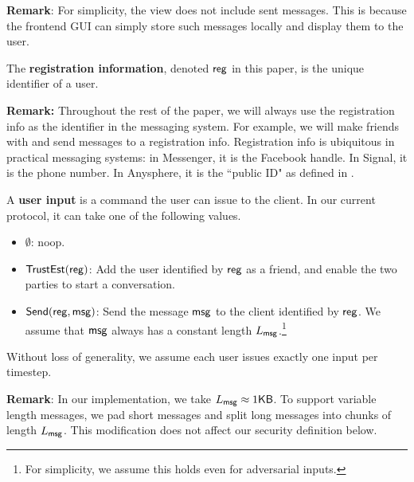 \textbf{Remark}: For simplicity, the view does not include sent messages. This is because the frontend GUI can simply store such messages locally and display them to the user.
\begin{definition}
\label{defn:messaging-registration-info}
The \textbf{registration information}, denoted $\mathsf{reg}$ in this paper, is the unique identifier of a user.
\end{definition}
\textbf{Remark: }Throughout the rest of the paper, we will always use the registration info as the identifier in the messaging system. For example, we will make friends with and send messages to a registration info. Registration info is ubiquitous in practical messaging systems: in Messenger, it is the Facebook handle. In Signal, it is the phone number. In Anysphere, it is the ``public ID" as defined in \cite[Figure 6]{whitepaper}.
\begin{definition}
\label{defn:messaging-user-input}
A \textbf{user input} is a command the user can issue to the client. In our current protocol, it can take one of the following values.
\begin{itemize}
    \item $\emptyset$: noop.
    \item $\mathsf{TrustEst}(\mathsf{reg})$: Add the user identified by $\mathsf{reg}$ as a friend, and enable the two parties to start a conversation.
    \item $\mathsf{Send}(\mathsf{reg}, \mathsf{msg})$: Send the message $\mathsf{msg}$ to the client identified by $\mathsf{reg}$. We assume that $\mathsf{msg}$ always has a constant length $L_{\mathsf{msg}}$.\footnote{For simplicity, we assume this holds even for adversarial inputs.}
\end{itemize}


Without loss of generality, we assume each user issues exactly one input per timestep.
\end{definition}
\textbf{Remark}:  In our implementation, we take $L_{\mathsf{msg}} \approx 1\mathsf{KB}$. To support variable length messages, we pad short messages and split long messages into chunks of length $L_{\mathsf{msg}}$. This modification does not affect our security definition below.
